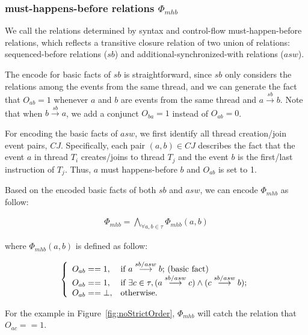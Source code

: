 \documentclass[preprint, numbers, 10pt]{sigplanconf}
\begin{document}
\subsubsection{must-happens-before relations $\Phi_{mhb}$}

We call the relations determined by syntax and control-flow must-happen-before relations,
which reflects a transitive closure relation of two union of relations: sequenced-before
relations ($sb$) and additional-synchronized-with relations ($asw$). 

The encode for basic facts of $sb$ is straightforward, since $sb$ only 
considers the relations among the events from the same thread, and 
we can generate the fact that $O_{ab}=1$ whenever 
$a$ and $b$ are events from the same thread and $a \stackrel{sb}{\longrightarrow} b$. 
Note that when $b \stackrel{sb}{\longrightarrow} a$, we add a conjunct $O_{ba}=1$ instead of
$O_{ab}=0$. 

For encoding the basic facts of $asw$, we first identify all thread creation/join event pairs, $CJ$.
Specifically, each pair $(a,b)\in CJ$ describes the fact that the event $a$ in thread $T_i$ creates/joins to 
thread $T_j$ and the event $b$ is the first/last instruction of $T_j$. Thus,
$a$ must happens-before $b$ and $O_{ab}$ is set to 1.

Based on the encoded basic facts of both $sb$ and $asw$, we can encode $\Phi_{mhb}$ as follow: 

\begin{equation}
\begin{aligned}
\Phi_{mhb} = \bigwedge_{\forall a,b\in \tau} \Phi_{mhb}(a,b)
\end{aligned}
\end{equation}

where $\Phi_{mhb}(a,b)$ is defined as follow: 

\[ \left\{
  \begin{array}{l l}
    O_{ab}==1,           &  {\text{if $a \stackrel{sb/asw}{\longrightarrow} b$; (basic fact)}}\\
    O_{ab}==1,			   &  {\text{if $\exists c\in \tau, (a \stackrel{sb/asw}{\longrightarrow} c)\wedge (c \stackrel{sb/asw}{\longrightarrow} b)$}};\\
    O_{ab}==\bot,  &  \text{otherwise}.
  \end{array} \right.\]

For the example in Figure~\ref{fig:noStrictOrder}, $\Phi_{mhb}$ will catch the relation
that $O_{ac}==1$. 
\end{document}

